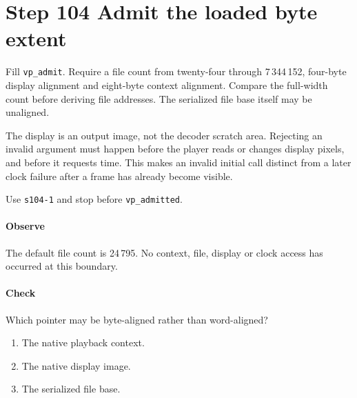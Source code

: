 \section{Step 104 Admit the loaded byte extent}
Fill \texttt{vp\_admit}. Require a file count from twenty-four through 7\,344\,152, four-byte display alignment and eight-byte context alignment. Compare the full-width count before deriving file addresses. The serialized file base itself may be unaligned.

The display is an output image, not the decoder scratch area. Rejecting an invalid argument must happen before the player reads or changes display pixels, and before it requests time. This makes an invalid initial call distinct from a later clock failure after a frame has already become visible.

Use \texttt{s104-1} and stop before \texttt{vp\_admitted}.

\paragraph{Observe} The default file count is 24\,795. No context, file, display or clock access has occurred at this boundary.

\paragraph{Check} Which pointer may be byte-aligned rather than word-aligned?
\begin{enumerate}[label=\Alph*.]
\item The native playback context.
\item The native display image.
\item The serialized file base.
\end{enumerate}
